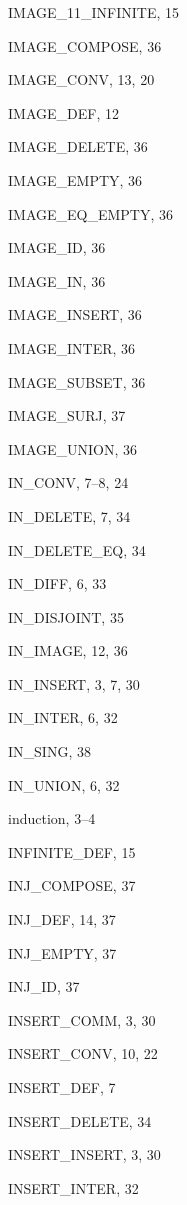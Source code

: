 \begin{theindex}
  \item {\ptt IMAGE\_11\_INFINITE}, 15
  \item {\ptt IMAGE\_COMPOSE}, 36
  \item {\ptt IMAGE\_CONV}, 13, 20
  \item {\ptt IMAGE\_DEF}, 12
  \item {\ptt IMAGE\_DELETE}, 36
  \item {\ptt IMAGE\_EMPTY}, 36
  \item {\ptt IMAGE\_EQ\_EMPTY}, 36
  \item {\ptt IMAGE\_ID}, 36
  \item {\ptt IMAGE\_IN}, 36
  \item {\ptt IMAGE\_INSERT}, 36
  \item {\ptt IMAGE\_INTER}, 36
  \item {\ptt IMAGE\_SUBSET}, 36
  \item {\ptt IMAGE\_SURJ}, 37
  \item {\ptt IMAGE\_UNION}, 36
  \item {\ptt IN\_CONV}, 7--8, 24
  \item {\ptt IN\_DELETE}, 7, 34
  \item {\ptt IN\_DELETE\_EQ}, 34
  \item {\ptt IN\_DIFF}, 6, 33
  \item {\ptt IN\_DISJOINT}, 35
  \item {\ptt IN\_IMAGE}, 12, 36
  \item {\ptt IN\_INSERT}, 3, 7, 30
  \item {\ptt IN\_INTER}, 6, 32
  \item {\ptt IN\_SING}, 38
  \item {\ptt IN\_UNION}, 6, 32
  \item induction, 3--4
  \item {\ptt INFINITE\_DEF}, 15
  \item {\ptt INJ\_COMPOSE}, 37
  \item {\ptt INJ\_DEF}, 14, 37
  \item {\ptt INJ\_EMPTY}, 37
  \item {\ptt INJ\_ID}, 37
  \item {\ptt INSERT\_COMM}, 3, 30
  \item {\ptt INSERT\_CONV}, 10, 22
  \item {\ptt INSERT\_DEF}, 7
  \item {\ptt INSERT\_DELETE}, 34
  \item {\ptt INSERT\_INSERT}, 3, 30
  \item {\ptt INSERT\_INTER}, 32

\end{theindex}
